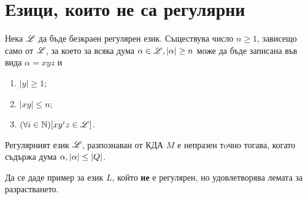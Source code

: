 \section{Езици, които не са регулярни}
\begin{lemma}
  Нека $\mathscr{L}$ да бъде безкраен регулярен език.
  Съществува число $n\geq 1$, зависещо само от $\mathscr{L}$, 
  за което за всяка дума $\alpha\in \mathscr{L}, \vert{\alpha}\vert\geq n$ може да 
  бъде записана във вида $\alpha = xyz$ и 
  \begin{enumerate}
  \item
    $|y|\geq 1$;
  \item
    $|xy|\leq n$;
  \item
    $(\forall i\in\mathbb{N})[xy^iz \in \mathscr{L}]$.
  \end{enumerate}
\end{lemma}

\begin{crl}
  Регулярният език $\mathscr{L}$, 
  разпознаван от КДА $M$ е непразен тoчно тогава, когато съдържа дума $\alpha, \vert{\alpha}\vert \leq \vert{Q}\vert$.
\end{crl}

\begin{problem}
  Да се даде пример за език $L$, който {\bf не} е регулярен, но удовлетворява
  лемата за разрастването.
\end{problem}


